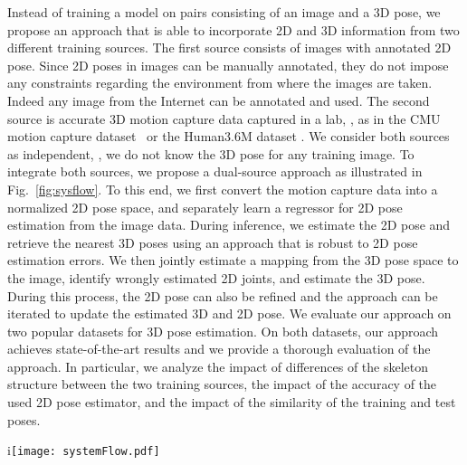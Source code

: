 \documentclass[10pt,twocolumn,letterpaper]{article}
\begin{document}
Instead of training a model on pairs consisting of an image and a 3D pose, we propose an approach that is able to incorporate 2D and 3D information from two different training sources.
The first source consists of images with annotated 2D pose. Since 2D poses in images can be manually annotated, they do not impose any constraints regarding the environment from where the images are taken. Indeed any image from the Internet can be annotated and used. The second source is accurate 3D motion capture data captured in a lab, \eg, as in the CMU motion capture dataset~\cite{cmu_mocap} or the Human3.6M dataset \cite{h36m_pami}. We consider both sources as independent, \ie, we do not know the 3D pose for any training image. To integrate both sources, we propose a dual-source approach as illustrated in Fig.~\ref{fig:sysflow}. To this end, we first convert the motion capture data into a normalized 2D pose space, and separately learn a regressor for 2D pose estimation from the image data. During inference, we estimate the 2D pose and retrieve the nearest 3D poses using an approach that is robust to 2D pose estimation errors.
We then jointly estimate a mapping from the 3D pose space to the image, identify wrongly estimated 2D joints, and estimate the 3D pose. During this process, the 2D pose can also be refined and the approach can be iterated to update the estimated 3D and 2D pose. We evaluate our approach on two popular datasets for 3D pose estimation. On both datasets, our approach achieves state-of-the-art results and we provide a thorough evaluation of the approach. In particular, we analyze the impact of differences of the skeleton structure between the two training sources, the impact of the accuracy of the used 2D pose estimator, and the impact of the similarity of the training and test poses.

\begin{figure*}[t]
\begin{center}
 i\texttt{[image: systemFlow.pdf]}
\end{center}
\vspace{-2mm}	
\caption{
{\bf Overview.} Our approach relies on two training sources. The first source is a motion capture database that contains only 3D poses. The second source is an image database with annotated 2D poses. The motion capture data is processed by pose normalization and projecting the poses to 2D using several virtual cameras. This gives many 3D-2D pairs where the 2D poses serve as features. The image data is used to learn a pictorial structure model (PSM) for 2D pose estimation where the unaries are learned by a random forest. Given a test image, the PSM predicts the 2D pose which is then used to retrieve the normalized nearest 3D poses. The final 3D pose is then estimated by minimizing the projection error under the constraint that the solution is close to the retrieved poses, which are weighted by the unaries of the PSM. The steps (\emph{red arrows}) in the dashed box can be iterated by updating the binaries of the PSM using the retrieved poses and updating the 2D pose.
}
\vspace{-2mm}
\label{fig:sysflow}
\end{figure*}
\end{document}
